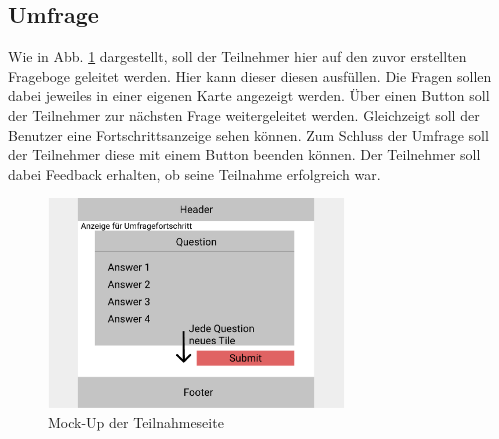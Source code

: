 \subsection{Umfrage}
\label{ssec:konzept:client:umfrage}
Wie in Abb. \ref{fig:MockUmfrageTeilnehmer} dargestellt, soll der Teilnehmer hier auf den zuvor erstellten Frageboge geleitet werden. 
Hier kann dieser diesen ausfüllen.
Die Fragen sollen dabei jeweiles in einer eigenen Karte angezeigt werden.
Über einen Button soll der Teilnehmer zur nächsten Frage weitergeleitet werden. 
Gleichzeigt soll der Benutzer eine Fortschrittsanzeige sehen können.
Zum Schluss der Umfrage soll der Teilnehmer diese mit einem Button beenden können.
Der Teilnehmer soll dabei Feedback erhalten, ob seine Teilnahme erfolgreich war. 

\begin{figure}[h]
	\centering
	\includegraphics[width=0.7\textwidth]{img/konzeption/client/umfrage_teilnehmer}
	\captionsetup{justification=centering, format=plain}
	\caption[Mock-Up der Teilnahmeseite]{Mock-Up der Teilnahmeseite\\\figma}
	\label{fig:MockUmfrageTeilnehmer}
\end{figure}